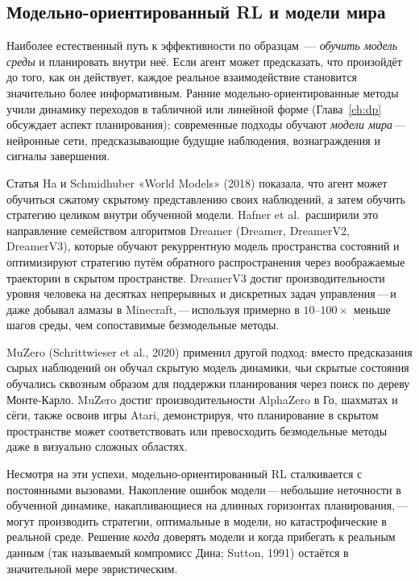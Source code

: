 \subsection{Модельно-ориентированный RL и модели мира}

Наиболее естественный путь к эффективности по образцам~--- \emph{обучить модель
среды} и планировать внутри неё. Если агент может предсказать, что
произойдёт до того, как он действует, каждое реальное взаимодействие становится значительно более
информативным. Ранние модельно-ориентированные методы учили динамику переходов в
табличной или линейной форме (Глава~\ref{ch:dp} обсуждает
аспект планирования); современные подходы обучают \emph{модели мира}\,---\,нейронные
сети, предсказывающие будущие наблюдения, вознаграждения и сигналы завершения.

Статья Ha и Schmidhuber «World Models» (2018) показала, что агент
может обучиться сжатому скрытому представлению своих
наблюдений, а затем обучить стратегию целиком внутри обученной
модели. Hafner et al.\ расширили это направление семейством алгоритмов Dreamer
(Dreamer, DreamerV2, DreamerV3), которые обучают
рекуррентную модель пространства состояний и оптимизируют стратегию путём
обратного распространения через воображаемые траектории в скрытом пространстве.
DreamerV3 достиг производительности уровня человека на десятках непрерывных и
дискретных задач управления\,---\,и даже добывал алмазы в Minecraft,\,---\,используя
примерно в $10$--$100\times$ меньше шагов среды, чем сопоставимые
безмодельные методы.

MuZero (Schrittwieser et al., 2020) применил другой подход:
вместо предсказания сырых наблюдений он обучал скрытую модель динамики,
чьи скрытые состояния обучались сквозным образом для поддержки планирования
через поиск по дереву Монте-Карло. MuZero достиг производительности
AlphaZero в Го, шахматах и сёги, также освоив игры Atari,
демонстрируя, что планирование в скрытом пространстве может соответствовать или превосходить
безмодельные методы даже в визуально сложных областях.

Несмотря на эти успехи, модельно-ориентированный RL сталкивается с постоянными вызовами.
Накопление ошибок модели\,---\,небольшие неточности в обученной
динамике, накапливающиеся на длинных горизонтах планирования,\,---\,могут производить
стратегии, оптимальные в модели, но катастрофические в реальной
среде. Решение \emph{когда} доверять модели и когда
прибегать к реальным данным (так называемый компромисс Дина; Sutton, 1991)
остаётся в значительной мере эвристическим.

